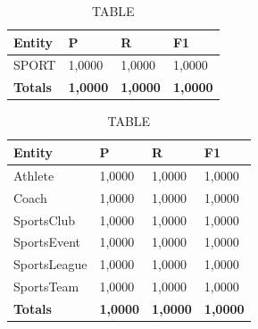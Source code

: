 \documentclass[thesis=M,english]{FITthesis}[2018/05/30]
\begin{document}
	\begin{table}[H]\centering
		\caption{TABLE}
		\label{}
		\begin{tabular}{|l|l|l|l|}
			\hline {\textbf{Entity}} & {\textbf{P}} & {\textbf{R}} & {\textbf{F1}}\\\hline
				SPORT & 1,0000 & 1,0000 & 1,0000\\\hline
				\textbf{Totals} & \textbf{1,0000} & \textbf{1,0000} & \textbf{1,0000}\\\hline
		\end{tabular}
	\end{table}	
	
	\begin{table}[H]\centering
		\caption{TABLE}
		\label{}
		\begin{tabular}{|l|l|l|l|}
			\hline {\textbf{Entity}} & {\textbf{P}} & {\textbf{R}} & {\textbf{F1}}\\\hline
				Athlete & 1,0000 & 1,0000 & 1,0000\\
				Coach & 1,0000 & 1,0000 & 1,0000\\
				SportsClub & 1,0000 & 1,0000 & 1,0000\\
				SportsEvent & 1,0000 & 1,0000 & 1,0000\\
				SportsLeague & 1,0000 & 1,0000 & 1,0000\\
				SportsTeam & 1,0000 & 1,0000 & 1,0000\\\hline
				\textbf{Totals} & \textbf{1,0000} & \textbf{1,0000} & \textbf{1,0000}\\\hline
		\end{tabular}
	\end{table}	
	
	
\end{document}

